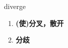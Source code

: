 
\begin{frame}
{\huge diverge}
\begin{center}
\begin{enumerate}\Large
  \item \textbf{(使)分叉，散开}
  \item \textbf{分歧}
\end{enumerate}
\end{center}
\end{frame}
